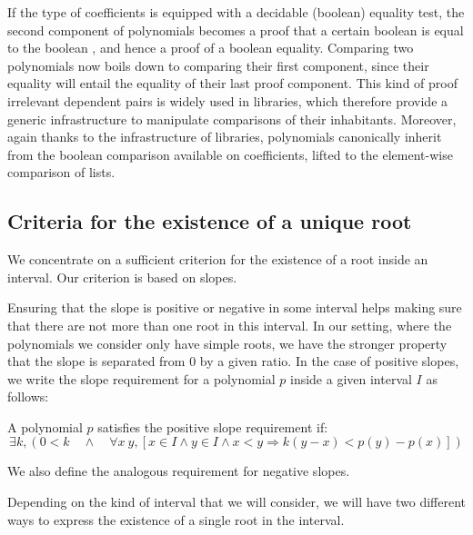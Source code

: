 \documentclass{mscs}
\begin{document}
If the type  of coefficients is equipped with a decidable
(boolean) equality test, the second component of polynomials becomes a
proof that a certain boolean is equal to the boolean , and
hence a proof of a boolean equality. Comparing two polynomials now
boils down to comparing their first component, since their equality
will entail the equality of their last proof component. This
kind of proof irrelevant dependent pairs is widely used in \ssr{}
libraries, which therefore provide a generic infrastructure to
manipulate comparisons of their inhabitants. Moreover, again thanks
to the infrastructure of \ssr{} libraries, polynomials
canonically inherit from the boolean comparison available on
coefficients, lifted to the element-wise comparison of lists.


\subsection{Criteria for the existence of a unique root}
\label{sec:criteria}
We concentrate on a sufficient criterion for the existence of a root
inside an interval.  %
Our criterion is based on slopes.

Ensuring that the slope is positive or negative in some interval helps
making sure that there are not more than one root in this interval.  In our
setting, where the polynomials we consider only have simple roots, we
have the stronger
property that the slope is separated from 0 by a given ratio.  In the
case of positive slopes, we write the slope requirement for a
polynomial \(p\) inside a given interval \(I\) as follows:
\begin{definition}
A polynomial $p$ satisfies the positive slope requirement if:
\[\exists k, (0 < k \quad \wedge \quad \forall x\ y, [x \in I \wedge y \in I
\wedge x < y \Rightarrow k(y - x) < p(y) - p (x)]) \]
\end{definition}
We also define the analogous requirement for negative slopes.

Depending on the kind of interval that we will consider, we will have
two different ways to express the existence of a single root in the
interval.
\end{document}
